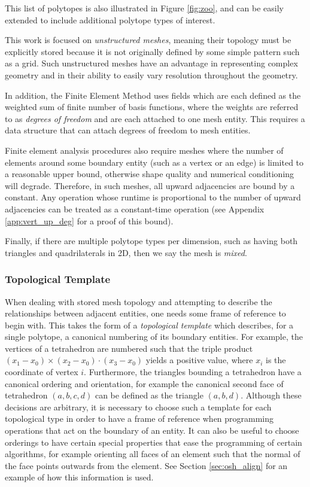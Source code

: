 This list of polytopes is also illustrated in Figure
\ref{fig:zoo}, and
can be easily extended to include additional polytope
types of interest.

This work is focused on \emph{unstructured meshes}, meaning
their topology must be explicitly stored because it
is not originally defined by some simple pattern such as a grid.
Such unstructured meshes have an
advantage in representing complex geometry and in their
ability to easily vary resolution throughout the geometry.

In addition, the Finite Element Method uses fields which are each defined
as the weighted sum of finite number of basis functions,
where the weights are referred to as \emph{degrees of freedom} and are each
attached to one mesh entity.
This requires a data structure that can attach
degrees of freedom to mesh entities.

Finite element analysis procedures also require meshes where
the number of elements around some boundary entity (such as a vertex
or an edge) is limited to a reasonable upper bound,
otherwise shape quality and numerical conditioning will degrade.
Therefore, in such meshes, all upward adjacencies are bound
by a constant.
Any operation whose runtime is proportional to the
number of upward adjacencies can be treated as a constant-time operation
(see Appendix \ref{app:vert_up_deg} for a proof of this bound).

Finally, if there are multiple polytope types per dimension,
such as having both triangles and quadrilaterals in 2D, then
we say the mesh is {\it mixed}.

\subsubsection{Topological Template}
\label{sec:topo_template}

When dealing with stored mesh topology and attempting to describe
the relationships between adjacent entities, one needs some frame
of reference to begin with.
This takes the form of a \emph{topological template}
\cite{seol2005fmdb, karamete2016novel} which describes,
for a single polytope, a canonical numbering of its boundary entities.
For example, the vertices of a tetrahedron are numbered such that
the triple product $(x_1-x_0)\times(x_2-x_0)\cdot(x_3-x_0)$ yields
a positive value, where $x_i$ is the coordinate of vertex $i$.
Furthermore, the triangles bounding a tetrahedron have a canonical
ordering and orientation, for example the canonical second face of tetrahedron
$(a,b,c,d)$ can be defined as the triangle $(a,b,d)$.
Although these decisions are arbitrary, it is necessary to choose
such a template for each topological type in order to have
a frame of reference when programming operations that act on the boundary
of an entity.
It can also be useful to choose orderings to have certain special
properties that ease the programming of certain algorithms, for
example orienting all faces of an element such that the normal of
the face points outwards from the element.
See Section \ref{sec:osh_align} for an example of how this
information is used.

